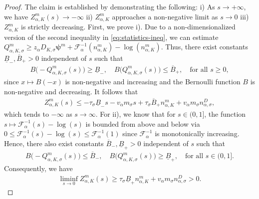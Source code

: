 \documentclass[10pt,a4paper]{amsart}
\begin{document}
\begin{proof}
    The claim is established by demonstrating the following:
    i) As $s\rightarrow + \infty $, we have $Z_{\alpha, K}^m(s) \rightarrow - \infty$
    ii) $Z_{\alpha, K}^m$ approaches a non-negative limit as $s\rightarrow 0$
    iii) $Z_{\alpha, K}^m$ is strictly decreasing.
    First, we prove i).
    Due to a non-dimensionalized version of the second inequality in \eqref{eq:statistics-ineq}, we can estimate
    $
        Q_{\alpha, K, \sigma}^m
        \geq
        z_\alpha D_{K, \sigma} \boldsymbol{\psi}^m + \mathcal{F}_\alpha^{-1}(n_{\alpha, K}^m) - \log(n_{\alpha, K}^m).
    $
    Thus, there exist constants $\underline{B}_{-}, \overline{B}_{+} > 0$ independent of $s$ such that
    \begin{align*}
        B\bigl( -Q_{\alpha, K, \sigma}^m (s) \bigr) \geq \underline{B}_{-},
        \quad
        B\bigl( Q_{\alpha, K, \sigma}^m (s) \bigr) \leq \overline{B}_{+},
            \quad  \text{for all } s \geq 0,
    \end{align*}
    since $x\mapsto B(-x) $ is non-negative and increasing and the Bernoulli function $B$ is non-negative and decreasing.
    It follows that
    \begin{align*}
        Z_{\alpha, K}^m (s)
        \leq
        - \tau_\sigma  \underline{B}_{-} s - v_\alpha m_\sigma s
        + \tau_\sigma  \overline{B}_{+} n_{\alpha, K}^m + v_\alpha m_\sigma n_{\alpha, \sigma}^D,
    \end{align*}
    which tends to $-\infty$ as $s \rightarrow \infty$.
    For ii), we know that for $s \in (0,1]$, the function $s \mapsto \mathcal{F}_\alpha^{-1}(s) - \log(s)$ is bounded from above and below via $0 \leq \mathcal{F}_\alpha^{-1}(s) - \log(s) \leq \mathcal{F}_\alpha^{-1}(1)$ since $\mathcal{F}_\alpha^{-1}$ is monotonically increasing.
    Hence, there also exist constants $\overline{B}_{-}, \underline{B}_{+} > 0$ independent of $s$ such that
    \begin{align*}
        B\bigl( -Q_{\alpha, K, \sigma}^m  (s) \bigr) \leq \overline{B}_{-},
        \quad
        B\bigl( Q_{\alpha, K, \sigma}^m  (s) \bigr) \geq \underline{B}_{+},
            \quad  \text{for all } s \in (0,1].
    \end{align*}
    Consequently,  we have
    \begin{align*}
        \liminf_{s\rightarrow 0} Z_{\alpha, K}^m (s)
        \geq
        \tau_\sigma  \underline{B}_{+} n_{\alpha, K}^m + v_\alpha m_\sigma n_{\alpha, \sigma}^D > 0.
    \end{align*}

\end{proof}
\end{document}
